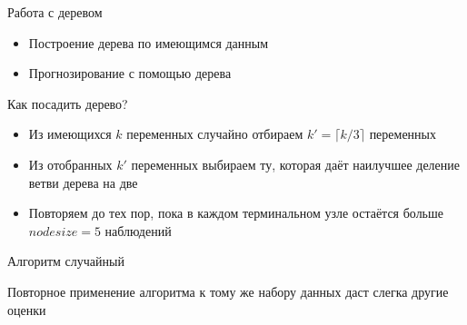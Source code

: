 \documentclass[ignorenonframetext,]{beamer}
\begin{document}
\begin{frame}{Работа с деревом}

\begin{itemize}
\item
  Построение дерева по имеющимся данным
\item
  Прогнозирование с помощью дерева
\end{itemize}

\end{frame}

\begin{frame}{Как посадить дерево?}

\begin{itemize}
\item
  Из имеющихся \(k\) переменных случайно отбираем
  \(k'=\lceil k/3 \rceil\) переменных
\item
  Из отобранных \(k'\) переменных выбираем ту, которая даёт наилучшее
  деление ветви дерева на две
\item
  Повторяем до тех пор, пока в каждом терминальном узле остаётся больше
  \(nodesize=5\) наблюдений
\end{itemize}

\end{frame}

\begin{frame}{Алгоритм случайный}

Повторное применение алгоритма к тому же набору данных даст слегка
другие оценки

\end{frame}
\end{document}

